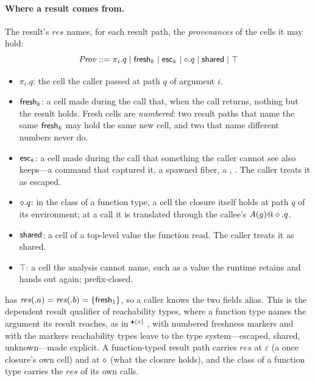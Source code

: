 \paragraph{Where a result comes from.} The result's $\mathit{res}$ names, for each result path, the
\emph{provenances} of the cells it may hold:
\[
\mathit{Prov} ::= \pi_i.q \mid \mathsf{fresh}_k \mid \mathsf{esc}_k \mid \diamond.q \mid \mathsf{shared} \mid \top
\]
\begin{itemize}
\item $\pi_i.q$: the cell the caller passed at path $q$ of argument $i$.
\item $\mathsf{fresh}_k$: a cell made during the call that, when the call returns, nothing but the result
holds. Fresh cells are \emph{numbered}: two result paths that name the same $\mathsf{fresh}_k$ may hold the same
new cell, and two that name different numbers never do.
\item $\mathsf{esc}_k$: a cell made during the call that something the caller cannot see also keeps---a command
that captured it, a spawned fiber, a , . The caller treats it as escaped.
\item $\diamond.q$: in the class of a function type, a cell the closure itself holds at path $q$ of its
environment; at a call it is translated through the callee's $A(g)@\diamond.q$.
\item $\mathsf{shared}$: a cell of a top-level value the function read. The caller treats it as shared.
\item $\top$: a cell the analysis cannot name, such as a value the runtime retains and hands out again;
prefix-closed.
\end{itemize}
 has $\mathit{res}(.a) = \mathit{res}(.b) = \{\mathsf{fresh}_1\}$,
so a caller knows the two fields alias. This is the dependent result qualifier of reachability types,
where a function type names the argument its result reaches, as in
$^{\blacklozenge}$$^{\{x\}}$ \citep[\S2.2]{wei2024polymorphic}, with numbered
freshness markers and with the markers reachability types leave to the type system---escaped, shared,
unknown---made explicit. A function-typed result path carries $\mathit{res}$ at $\varepsilon$ (a once
closure's own cell) and at $\diamond$ (what the closure holds), and the class of a function type carries
the $\mathit{res}$ of its own calls.

